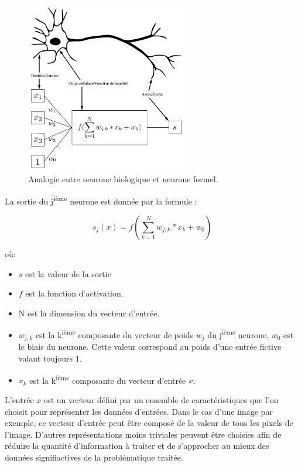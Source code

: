 \documentclass[a4paper,twoside]{report}
\begin{document}
				\begin{figure}
					\begin{center}
						\includegraphics[width=200pt]{Images/neurone-01.png}
					\end{center}
					\caption{Analogie entre neurone biologique et neurone formel.}
				\end{figure}

				La sortie du j\textsuperscript{ième} neurone est donnée par la formule :

				\begin{equation}\label{eqNeur}s_{j}(x)=f(\sum_{k=1}^{N} w_{j,k}*x_{k}+w_{0})\end{equation}

				où:
				\begin{itemize}
					\item $s$ est la valeur de la sortie
					\item $f$ est la fonction d'activation.
					\item N est la dimension du vecteur d'entrée.
					\item $w_{j,k}$ est la k\textsuperscript{ième} composante du vecteur de poids $w_{j}$ du j\textsuperscript{ième} neurone. $w_{0}$ est le biais du neurone. Cette valeur correspond au poids d'une entrée fictive valant toujours 1.
					\item $x_{k}$ est la k\textsuperscript{ième} composante du vecteur d'entrée $x$.\\
				\end{itemize}

				L'entrée $x$ est un vecteur défini par un ensemble de caractéristiques que l'on choisit pour représenter les données d'entrées. Dans le cas d'une image par exemple, ce vecteur d'entrée peut être composé de la valeur de tous les pixels de l'image. D'autres représentations moins triviales peuvent être choisies afin de réduire la quantité d'information à traiter et de s'approcher au mieux des données signifiactives de la problématique traitée.\\
\end{document}
